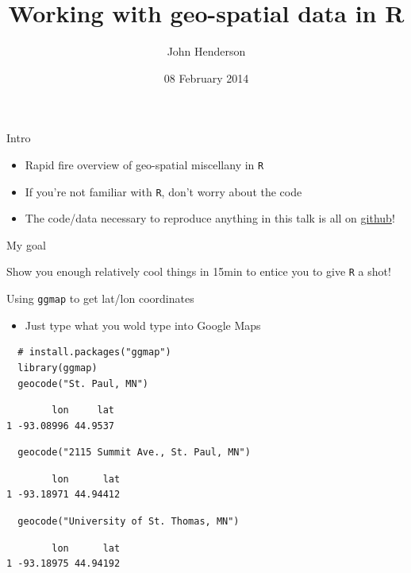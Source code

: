 \documentclass[sans,aspectratio=169,presentation,bigger,fleqn]{beamer}
\author{John Henderson}
\date{08 February 2014}
\title{Working with geo-spatial data in R}
\begin{document}
\maketitle


\begin{frame}[fragile,label=sec-1]{Intro}
 \begin{itemize}
\item Rapid fire overview of geo-spatial miscellany in \texttt{R}
\item If you're not familiar with \texttt{R}, don't worry about the code
\item The code/data necessary to reproduce anything in this talk is all on \href{https://github.com/jwhendy/devFest-geo}{github}!
\end{itemize}

\vspace{1cm} \pause

\alert{My goal}

Show you enough relatively cool things in 15min to entice you to give \texttt{R} a shot!
\end{frame}
\begin{frame}[fragile,label=sec-2]{Using \texttt{ggmap} to get lat/lon coordinates}
 \begin{itemize}
\item Just type what you wold type into Google Maps
\end{itemize}


\scriptsize

\begin{verbatim}
  # install.packages("ggmap")
  library(ggmap)
  geocode("St. Paul, MN")
\end{verbatim}
\begin{verbatim}
        lon     lat
1 -93.08996 44.9537
\end{verbatim}

\begin{verbatim}
  geocode("2115 Summit Ave., St. Paul, MN")
\end{verbatim}
\begin{verbatim}
        lon      lat
1 -93.18971 44.94412
\end{verbatim}

\begin{verbatim}
  geocode("University of St. Thomas, MN")
\end{verbatim}
\begin{verbatim}
        lon      lat
1 -93.18975 44.94192
\end{verbatim}

\normalsize
\end{frame}
\end{document}
